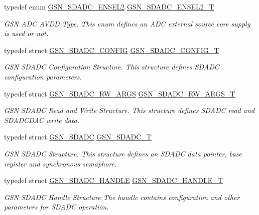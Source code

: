 \begin{DoxyCompactItemize}
typedef enum \hyperlink{a00652_ga940370ff6d2765c622f7687f6e6eee6a}{GSN\_\-SDADC\_\-ENSEL2} \hyperlink{a00652_gae94467e442a092eb6c551e3076850d12}{GSN\_\-SDADC\_\-ENSEL2\_\-T}
\begin{DoxyCompactList}\small\item\em GSN ADC AVDD Type. This enum defines an ADC external source core supply is used or not. \end{DoxyCompactList}\item 
typedef struct \hyperlink{a00213}{GSN\_\-SDADC\_\-CONFIG} \hyperlink{a00652_ga74fd69b30c22ac53de45e0914b171164}{GSN\_\-SDADC\_\-CONFIG\_\-T}
\begin{DoxyCompactList}\small\item\em GSN SDADC Configuration Structure. This structure defines SDADC configuration parameters. \end{DoxyCompactList}\item 
typedef struct \hyperlink{a00215}{GSN\_\-SDADC\_\-RW\_\-ARGS} \hyperlink{a00652_ga9a25b59de94ab9eb590861d864697679}{GSN\_\-SDADC\_\-RW\_\-ARGS\_\-T}
\begin{DoxyCompactList}\small\item\em GSN SDADC Read and Write Structure. This structure defines SDADC read and SDADCDAC write data. \end{DoxyCompactList}\item 
typedef struct \hyperlink{a00212}{GSN\_\-SDADC} \hyperlink{a00652_ga24812a09f6831a451bf951bbc956b2b9}{GSN\_\-SDADC\_\-T}
\begin{DoxyCompactList}\small\item\em GSN SDADC Structure. This structure defines an SDADC data pointer, base register and synchronous semaphore. \end{DoxyCompactList}\item 
typedef struct \hyperlink{a00214}{GSN\_\-SDADC\_\-HANDLE} \hyperlink{a00652_ga1c9d36e9faa624275bd36abfa94ac41f}{GSN\_\-SDADC\_\-HANDLE\_\-T}
\begin{DoxyCompactList}\small\item\em GSN SDADC Handle Structure The handle contains configuration and other parameters for SDADC operation. \end{DoxyCompactList}\end{DoxyCompactItemize}
